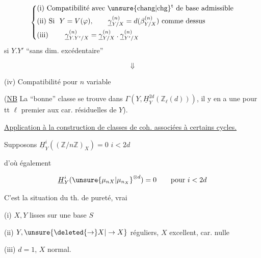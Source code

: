 \[
\left\{\begin{aligned}
&\text{(i) Compatibilité avec \unsure{chang|chg}\textsuperscript{t} de base admissible}\\
&\text{(ii) Si }\ Y=V(\varphi),\qquad \underline\gamma^{(n)}_{Y/X}=d(\beta^{(n)}_{Y/X})\ \text{comme dessus}\\
&\text{(iii) }\qquad \underline\gamma^{(n)}_{Y.Y'/X}=\underline\gamma^{(n)}_{Y/X}\mathbin{.}\underline\gamma^{(n)}_{Y'/X}
\end{aligned}\right.
\]
si $Y.Y'$ ``sans dim. excédentaire''

\[
\Downarrow
\]

(iv) Compatibilité pour $n$ variable

(\uline{NB} La ``bonne'' classe se trouve dans $\Gamma(Y,\underline H^{2d}_Y(\mathbb Z_\ell(d)))$, il y en a une pour tt $\ell$ premier aux car. résiduelles de $Y$).

\uline{Application à la construction de classes de coh. associées à certains cycles.}

Supposons $\underline H^i_Y((\mathbb Z/n\mathbb Z)_X)=0$   $i<2d$

d'où également

\[
\underline H^i_Y(\unsure{\mu_{nX}|\mu_{n_X}}^{\otimes d})=0\qquad\text{pour }i<2d
\]

C'est la situation du th. de pureté, vrai

(i) $X,Y$ lisses sur une base $S$

(ii) $Y,\unsure{\deleted{\to}X|\to X}$ réguliers, $X$ excellent, car. nulle

(iii) $d=1$, $X$ normal.

